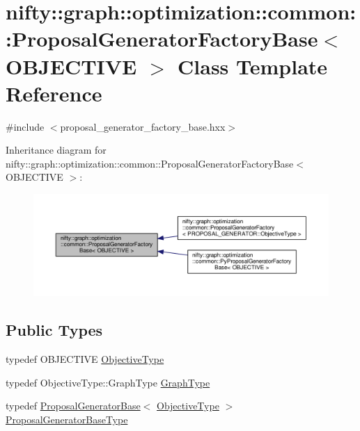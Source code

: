 \hypertarget{classnifty_1_1graph_1_1optimization_1_1common_1_1ProposalGeneratorFactoryBase}{}\section{nifty\+:\+:graph\+:\+:optimization\+:\+:common\+:\+:Proposal\+Generator\+Factory\+Base$<$ O\+B\+J\+E\+C\+T\+I\+V\+E $>$ Class Template Reference}
\label{classnifty_1_1graph_1_1optimization_1_1common_1_1ProposalGeneratorFactoryBase}


{\ttfamily \#include $<$proposal\+\_\+generator\+\_\+factory\+\_\+base.\+hxx$>$}



Inheritance diagram for nifty\+:\+:graph\+:\+:optimization\+:\+:common\+:\+:Proposal\+Generator\+Factory\+Base$<$ O\+B\+J\+E\+C\+T\+I\+V\+E $>$\+:\nopagebreak
\begin{figure}[H]
\begin{center}
\leavevmode
\includegraphics[width=350pt]{classnifty_1_1graph_1_1optimization_1_1common_1_1ProposalGeneratorFactoryBase__inherit__graph}
\end{center}
\end{figure}
\subsection*{Public Types}
\begin{DoxyCompactItemize}
\item 
typedef O\+B\+J\+E\+C\+T\+I\+V\+E \hyperlink{classnifty_1_1graph_1_1optimization_1_1common_1_1ProposalGeneratorFactoryBase_aa5736d89b93a428099cc2f867266c8c7}{Objective\+Type}
\item 
typedef Objective\+Type\+::\+Graph\+Type \hyperlink{classnifty_1_1graph_1_1optimization_1_1common_1_1ProposalGeneratorFactoryBase_afbc5ea0723729b327417d43729cdf084}{Graph\+Type}
\item 
typedef \hyperlink{classnifty_1_1graph_1_1optimization_1_1common_1_1ProposalGeneratorBase}{Proposal\+Generator\+Base}$<$ \hyperlink{classnifty_1_1graph_1_1optimization_1_1common_1_1ProposalGeneratorFactoryBase_aa5736d89b93a428099cc2f867266c8c7}{Objective\+Type} $>$ \hyperlink{classnifty_1_1graph_1_1optimization_1_1common_1_1ProposalGeneratorFactoryBase_ac2be47e9c7b7a249b3d597831c50405d}{Proposal\+Generator\+Base\+Type}
\end{DoxyCompactItemize}
